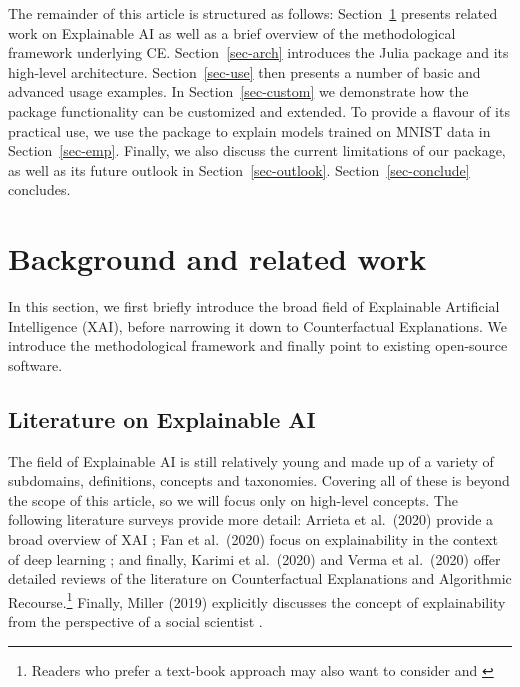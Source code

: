 \documentclass{juliacon}
\begin{document}
The remainder of this article is structured as follows:
Section~\ref{sec-related} presents related work on Explainable AI as
well as a brief overview of the methodological framework underlying CE.
Section~\ref{sec-arch} introduces the Julia package and its high-level
architecture. Section~\ref{sec-use} then presents a number of basic and
advanced usage examples. In Section~\ref{sec-custom} we demonstrate how
the package functionality can be customized and extended. To provide a
flavour of its practical use, we use the package to explain models
trained on MNIST data in Section~\ref{sec-emp}. Finally, we also discuss
the current limitations of our package, as well as its future outlook in
Section~\ref{sec-outlook}. Section~\ref{sec-conclude} concludes.

\hypertarget{sec-related}{%
\section{Background and related work}\label{sec-related}}

In this section, we first briefly introduce the broad field of
Explainable Artificial Intelligence (XAI), before narrowing it down to
Counterfactual Explanations. We introduce the methodological framework
and finally point to existing open-source software.

\hypertarget{literature-on-explainable-ai}{%
\subsection{Literature on Explainable
AI}\label{literature-on-explainable-ai}}

The field of Explainable AI is still relatively young and made up of a
variety of subdomains, definitions, concepts and taxonomies. Covering
all of these is beyond the scope of this article, so we will focus only
on high-level concepts. The following literature surveys provide more
detail: Arrieta et al.~(2020) provide a broad overview of XAI
\cite{arrieta2020explainable}; Fan et al.~(2020) focus on explainability
in the context of deep learning \cite{fan2020interpretability}; and
finally, Karimi et al.~(2020) \cite{karimi2020survey} and Verma et
al.~(2020) \cite{verma2020counterfactual} offer detailed reviews of the
literature on Counterfactual Explanations and Algorithmic
Recourse.\footnote{Readers who prefer a text-book approach may also want
  to consider \cite{molnar2020interpretable} and
  \cite{varshney2022trustworthy}} Finally, Miller (2019) explicitly
discusses the concept of explainability from the perspective of a social
scientist \cite{miller2019explanation}.
\end{document}
